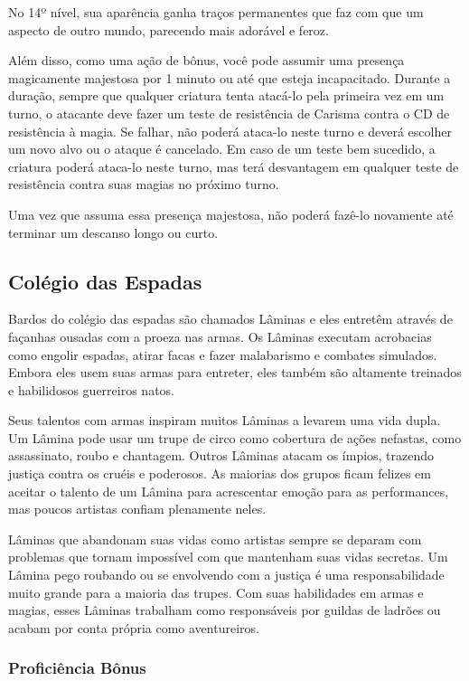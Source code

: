 \documentclass{RPG_Adventure}[2021/10/20]
\begin{document}
\begin{multicols}{2}
No 14º nível, sua aparência ganha traços permanentes que faz com que um aspecto
de outro mundo, parecendo mais adorável e feroz.

Além disso, como uma ação de bônus, você pode assumir uma presença magicamente
majestosa por 1 minuto ou até que esteja incapacitado. Durante a duração, sempre
que qualquer criatura tenta atacá-lo pela primeira vez em um turno, o atacante
deve fazer um teste de resistência de Carisma contra o CD de resistência à
magia. Se falhar, não poderá ataca-lo neste turno e deverá escolher um novo alvo
ou o ataque é cancelado. Em caso de um teste bem sucedido, a criatura poderá
ataca-lo neste turno, mas terá desvantagem em qualquer teste de resistência
contra suas magias no próximo turno.

Uma vez que assuma essa presença majestosa, não poderá fazê-lo novamente até
terminar um descanso longo ou curto.

\subsection*{Colégio das Espadas}%

Bardos do colégio das espadas são chamados Lâminas e eles entretêm através de
façanhas ousadas com a proeza nas armas. Os Lâminas executam acrobacias como
engolir espadas, atirar facas e fazer malabarismo e combates simulados. Embora
eles usem suas armas para entreter, eles também são altamente treinados e
habilidosos guerreiros natos.

Seus talentos com armas inspiram muitos Lâminas a levarem uma vida dupla. Um
Lâmina pode usar um trupe de circo como cobertura de ações nefastas, como
assassinato, roubo e chantagem. Outros Lâminas atacam os ímpios, trazendo
justiça contra os cruéis e poderosos. As maiorias dos grupos ficam felizes em
aceitar o talento de um Lâmina para acrescentar emoção para as performances, mas
poucos artistas confiam plenamente neles.

Lâminas que abandonam suas vidas como artistas sempre se deparam com problemas
que tornam impossível com que mantenham suas vidas secretas. Um Lâmina pego
roubando ou se envolvendo com a justiça é uma responsabilidade muito grande para
a maioria das trupes. Com suas habilidades em armas e magias, esses Lâminas
trabalham como responsáveis por guildas de ladrões ou acabam por conta própria
como aventureiros.

\subsubsection{Proficiência Bônus}%


\end{multicols}
\end{document}
